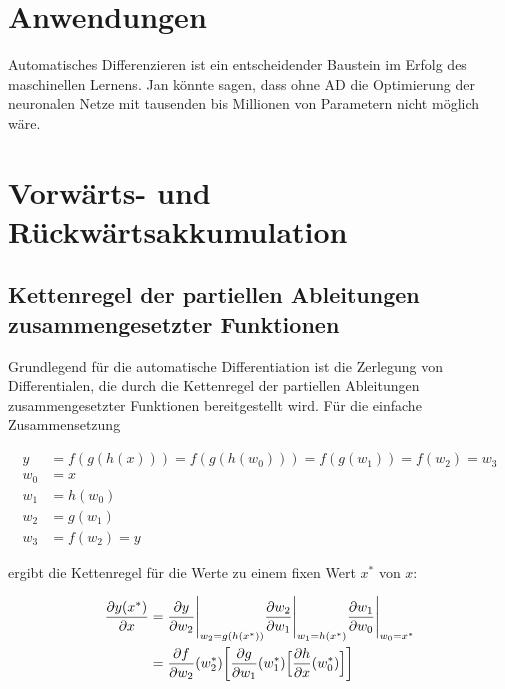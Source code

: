 \documentclass[
]{book}
\theoremstyle{definition}
\theoremstyle{definition}
\theoremstyle{definition}
\theoremstyle{definition}
\theoremstyle{remark}
\begin{document}
\hypertarget{anwendungen}{%
\section{Anwendungen}\label{anwendungen}}

Automatisches Differenzieren ist ein entscheidender Baustein im Erfolg des
maschinellen Lernens. Jan könnte sagen, dass ohne AD die Optimierung der
neuronalen Netze mit tausenden bis Millionen von Parametern nicht möglich
wäre.

\hypertarget{vorwuxe4rts--und-ruxfcckwuxe4rtsakkumulation}{%
\section{Vorwärts- und Rückwärtsakkumulation}\label{vorwuxe4rts--und-ruxfcckwuxe4rtsakkumulation}}

\hypertarget{kettenregel-der-partiellen-ableitungen-zusammengesetzter-funktionen}{%
\subsection{Kettenregel der partiellen Ableitungen zusammengesetzter Funktionen}\label{kettenregel-der-partiellen-ableitungen-zusammengesetzter-funktionen}}

Grundlegend für die automatische Differentiation ist die Zerlegung von
Differentialen, die durch die Kettenregel der partiellen Ableitungen
zusammengesetzter Funktionen bereitgestellt wird. Für die einfache
Zusammensetzung

\begin{align*}
y &= f(g(h(x))) = f(g(h(w_0))) = f(g(w_1)) = f(w_2) = w_3 \\
w_0 &= x \\ 
w_1 &= h(w_0) \\
w_2 &= g(w_1) \\
w_3 &= f(w_2) = y
\end{align*}

ergibt die Kettenregel für die Werte zu einem fixen Wert \(x^*\) von \(x\):

\begin{equation}
\begin{split}
\frac{\partial y(x^*)}{\partial x} &= 
\frac{\partial y}{\partial w_2}\Biggl|_{w_2=g(h(x^*))} \frac{\partial w_2}{\partial w_1} \Biggl|_{w_1=h(x^*)}\frac{\partial w_1}{\partial w_0}\Biggl|_{w_0=x^*} \\
&= \frac{\partial f}{\partial w_2}(w_2^*)\biggl[ \frac{\partial g}{\partial w_1}(w_1^*) \Bigl[\frac{\partial h}{\partial x}(w_0^*) \Bigr] \biggr]
\end{split}
\label{eq:eqn-chainrule-fgh}
\end{equation}
\end{document}
